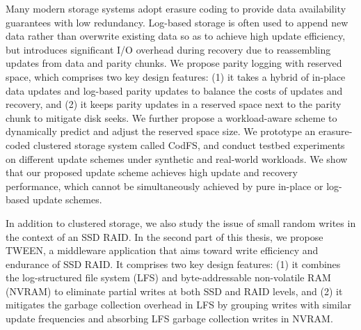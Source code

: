 Many modern storage systems adopt erasure coding to provide data availability
guarantees with low redundancy.  Log-based storage is often used to
append new data rather than overwrite existing data so as to achieve high
update efficiency, but introduces significant I/O overhead during recovery due
to reassembling updates from data and parity chunks.  We propose parity
logging with reserved space, which comprises two key design features: (1) it
takes a hybrid of in-place data updates and log-based parity updates to
balance the costs of updates and recovery, and (2) it keeps parity updates in
a reserved space next to the parity chunk to mitigate disk seeks.  We further
propose a workload-aware scheme to dynamically predict and adjust the reserved
space size.  We prototype an erasure-coded clustered storage system called
CodFS, and conduct testbed experiments on different
update schemes under synthetic and real-world workloads.  We show that
our proposed update scheme achieves high update and recovery
performance, which cannot be simultaneously achieved by pure in-place or
log-based update schemes.

In addition to clustered storage, we also study the issue of small random 
writes in the context of an SSD RAID. In the second part of this thesis, 
we propose TWEEN, a middleware application that aims toward write efficiency 
and endurance of SSD RAID.  It comprises two key design features: 
(1) it combines the log-structured file system (LFS) and byte-addressable 
non-volatile RAM (NVRAM) to eliminate partial writes at both SSD and RAID 
levels, and (2) it mitigates the garbage collection overhead in LFS by 
grouping writes with similar update frequencies and absorbing LFS 
garbage collection writes in NVRAM. 
